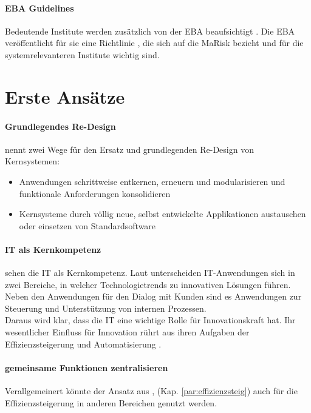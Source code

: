 \paragraph{EBA Guidelines}
Bedeutende Institute werden zusätzlich von der \ac{EBA} beaufsichtigt \cite{recht/Bornemann2018}. Die \ac{EBA} veröffentlicht für sie eine Richtlinie \cite{eba:2019}, die sich auf die \ac{MaRisk} bezieht und für die systemrelevanteren Institute wichtig sind.
%
%
%
%
\section{Erste Ansätze}

\paragraph{Grundlegendes Re-Design}
\label{ansatz:modularisieren}
\citet{Bussmann2006} nennt zwei Wege für den Ersatz und grundlegenden Re-Design von Kernsystemen:
\begin{itemize}
    \item Anwendungen schrittweise entkernen, erneuern und modularisieren und funktionale Anforderungen konsolidieren
    \item Kernsysteme durch völlig neue, selbst entwickelte Applikationen austauschen oder einsetzen von Standardsoftware
\end{itemize}

\paragraph{IT als Kernkompetenz} 
\citet{Bussmann2006} sehen die IT als Kernkompetenz. Laut \citet{Bussmann2006} unterscheiden IT-Anwendungen sich in zwei Bereiche, in welcher Technologietrends zu innovativen Lösungen führen. Neben den Anwendungen für den Dialog mit Kunden sind es Anwendungen zur Steuerung und Unterstützung von internen Prozessen.
\medskip
\\
Daraus wird klar, dass die IT eine wichtige Rolle für Innovationskraft hat. Ihr wesentlicher Einfluss für Innovation rührt aus ihren Aufgaben der Effizienzsteigerung \citet{Gupta:2017} und Automatisierung \cite{Alt2017}.

\paragraph{gemeinsame Funktionen zentralisieren}
Verallgemeinert könnte der Ansatz aus \cite[S.5]{Gupta:2017}, (Kap. \ref{par:effizienzsteig}) auch für die Effizienzsteigerung in anderen Bereichen genutzt werden. 

